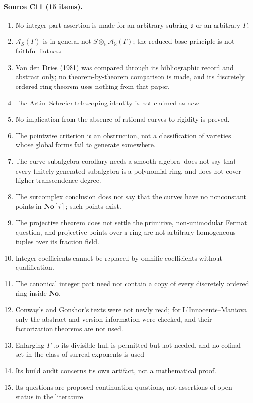 \documentclass[11pt,oneside]{article}
\numberwithin{equation}{section}
\theoremstyle{definition}
\theoremstyle{remark}
\newcommand{\No}{\mathbf{No}}
\newcommand{\crA}{\mathcal A_\Bbbk(\Gamma)}
\begin{document}
\paragraph{Source C11 (15 items).}
\begin{enumerate}[leftmargin=*,itemsep=1pt]
\item No integer-part assertion is made for an arbitrary subring $\mathfrak o$ or an
arbitrary $\Gamma$.
\item $\mathcal A_S(\Gamma)$ is in general not $S\otimes_\Bbbk\crA$; the reduced-base
principle is not faithful flatness.
\item Van den Dries (1981) was compared through its bibliographic record and abstract
only; no theorem-by-theorem comparison is made, and its discretely ordered ring theorem
uses nothing from that paper.
\item The Artin--Schreier telescoping identity is not claimed as new.
\item No implication from the absence of rational curves to rigidity is proved.
\item The pointwise criterion is an obstruction, not a classification of varieties
whose global forms fail to generate somewhere.
\item The curve-subalgebra corollary needs a smooth algebra, does not say that every
finitely generated subalgebra is a polynomial ring, and does not cover higher
transcendence degree.
\item The surcomplex conclusion does not say that the curves have no nonconstant points
in $\No[i]$; such points exist.
\item The projective theorem does not settle the primitive, non-unimodular Fermat
question, and projective points over a ring are not arbitrary homogeneous tuples over
its fraction field.
\item Integer coefficients cannot be replaced by omnific coefficients without
qualification.
\item The canonical integer part need not contain a copy of every discretely ordered ring
inside $\No$.
\item Conway's and Gonshor's texts were not newly read; for L'Innocente--Mantova only
the abstract and version information were checked, and their factorization theorems are
not used.
\item Enlarging $\Gamma$ to its divisible hull is permitted but not needed, and no
cofinal set in the class of surreal exponents is used.
\item Its build audit concerns its own artifact, not a mathematical proof.
\item Its questions are proposed continuation questions, not assertions of open status
in the literature.
\end{enumerate}
\end{document}
